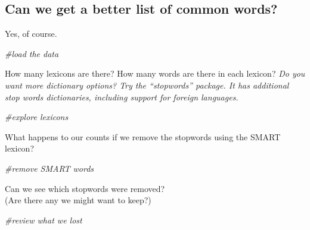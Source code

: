 \documentclass[
]{article}
\newenvironment{Shaded}{\begin{snugshade}}{\end{snugshade}}
\newcommand{\CommentTok}[1]{\textcolor[rgb]{0.56,0.35,0.01}{\textit{#1}}}
\begin{document}
\hypertarget{can-we-get-a-better-list-of-common-words}{%
\subsection{Can we get a better list of common
words?}\label{can-we-get-a-better-list-of-common-words}}

Yes, of course.

\begin{Shaded}
\begin{Highlighting}[]
\CommentTok{\#load the data}
\end{Highlighting}
\end{Shaded}

How many lexicons are there? How many words are there in each lexicon?
\emph{Do you want more dictionary options? Try the ``stopwords''
package. It has additional stop words dictionaries, including support
for foreign languages.}

\begin{Shaded}
\begin{Highlighting}[]
\CommentTok{\#explore lexicons}
\end{Highlighting}
\end{Shaded}

What happens to our counts if we remove the stopwords using the SMART
lexicon?

\begin{Shaded}
\begin{Highlighting}[]
\CommentTok{\#remove SMART words}
\end{Highlighting}
\end{Shaded}

Can we see which stopwords were removed?\\
(Are there any we might want to keep?)

\begin{Shaded}
\begin{Highlighting}[]
\CommentTok{\#review what we lost}
\end{Highlighting}
\end{Shaded}
\end{document}
